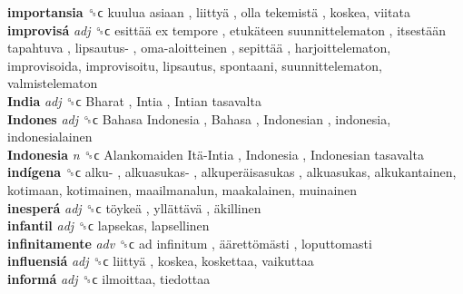 \textbf{importansia} ␝ϲ   kuulua asiaan ,  liittyä ,  olla tekemistä , koskea, viitata  \\
\textbf{improvisá} \emph{adj}  ␝ϲ   esittää ex tempore ,  etukäteen suunnittelematon ,  itsestään tapahtuva ,  lipsautus- ,  oma-aloitteinen ,  sepittää , harjoittelematon, improvisoida, improvisoitu, lipsautus, spontaani, suunnittelematon, valmistelematon  \\
\textbf{India} \emph{adj}  ␝ϲ   Bharat ,  Intia ,  Intian tasavalta   \\
\textbf{Indones} \emph{adj}  ␝ϲ   Bahasa Indonesia ,  Bahasa ,  Indonesian , indonesia, indonesialainen  \\
\textbf{Indonesia} \emph{n}  ␝ϲ   Alankomaiden Itä-Intia ,  Indonesia ,  Indonesian tasavalta   \\
\textbf{indígena} ␝ϲ   alku- ,  alkuasukas- ,  alkuperäisasukas , alkuasukas, alkukantainen, kotimaan, kotimainen, maailmanalun, maakalainen, muinainen  \\
\textbf{inesperá} \emph{adj}  ␝ϲ   töykeä ,  yllättävä ,  äkillinen   \\
\textbf{infantil} \emph{adj}  ␝ϲ  lapsekas, lapsellinen  \\
\textbf{infinitamente} \emph{adv}  ␝ϲ   ad infinitum ,  äärettömästi , loputtomasti  \\
\textbf{influensiá} \emph{adj}  ␝ϲ   liittyä , koskea, koskettaa, vaikuttaa  \\
\textbf{informá} \emph{adj}  ␝ϲ  ilmoittaa, tiedottaa  \\
